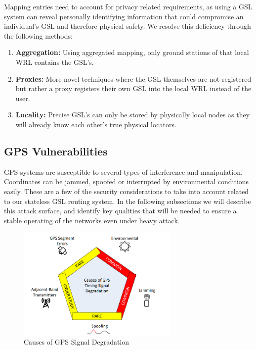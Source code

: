 \documentclass[11pt]{article}
\begin{document}
Mapping entries need to account for privacy related requirements, as using a GSL system can reveal personally identifying information that could compromise an individual's GSL and therefore physical safety. 
We resolve this deficiency through the following methods:

\begin{enumerate}
    \item \textbf{Aggregation:} Using aggregated mapping, only ground stations of that local WRL contains the GSL's.
    \item \textbf{Proxies:} More novel techniques where the GSL themselves are not registered but rather a proxy registers their own GSL into the local WRL instead of the user.
    \item \textbf{Locality:} Precise GSL's can only be stored by physically local nodes as they will already know each other's true physical locators.
\end{enumerate}



\subsection{GPS Vulnerabilities}

GPS systems are susceptible to several types of interference and manipulation. 
Coordinates can be jammed, spoofed or interrupted by environmental conditions easily. 
These are a few of the security considerations to take into account related to our stateless GSL routing system. 
In the following subsections we will describe this attack surface, and identify key qualities that will be needed to ensure a stable operating of the networks even under heavy attack.

\begin{figure}[h]
    \centering
    \includegraphics[width=0.7\textwidth]{./images/rsz_gps_signal.png}
    \caption{Causes of GPS Signal Degradation \cite{GPS-vulns}}
\end{figure}
\end{document}
